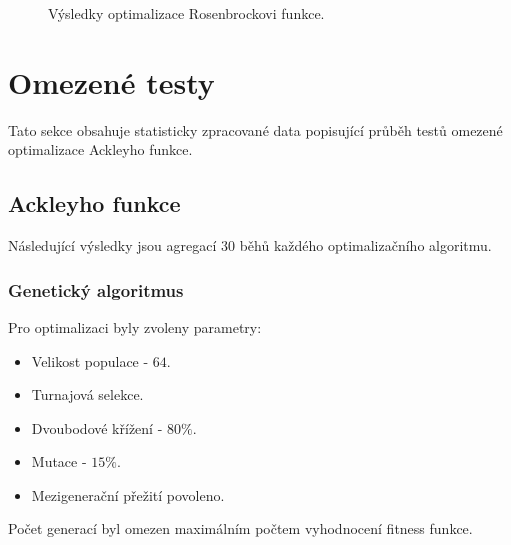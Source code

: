 \begin{figure}[H]
    \caption{Výsledky optimalizace Rosenbrockovi funkce.}
    \label{fg:validation:rosenbrock:joined}
\end{figure}

\section{Omezené testy}
Tato sekce obsahuje statisticky zpracované data popisující průběh testů omezené optimalizace Ackleyho funkce.
\label{app:bench}
\subsection{Ackleyho funkce}
\label{app:bench:ackley}

Následující výsledky jsou agregací $30$ běhů každého optimalizačního algoritmu.
\subsubsection{Genetický algoritmus}
Pro optimalizaci byly zvoleny parametry:
\begin{itemize}
    \item Velikost populace - $64$.
    \item Turnajová selekce.
    \item Dvoubodové křížení - $80\%$.
    \item Mutace - $15\%$.
    \item Mezigenerační přežití povoleno.
\end{itemize}
Počet generací byl omezen maximálním počtem vyhodnocení fitness funkce.

